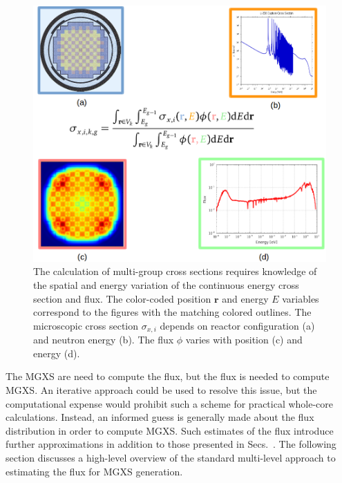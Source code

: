 \begin{figure}[h!]
  \centering
  \includegraphics[width=0.9\linewidth]{figures/mgxs/mgxs-overlay}
\caption[Energy and spatial variation in \ac{MGXS}]{The calculation of multi-group cross sections requires knowledge of the spatial and energy variation of the continuous energy cross section and flux. The color-coded position $\mathbf{r}$ and energy $E$ variables correspond to the figures with the matching colored outlines. The microscopic cross section $\sigma_{x,i}$ depends on reactor configuration (a) and neutron energy (b). The flux $\phi$ varies with position (c) and energy (d).}
\label{fig:chap2-mgxs-overlay}
\end{figure}

The \ac{MGXS} are need to compute the flux, but the flux is needed to compute \ac{MGXS}. An iterative approach could be used to resolve this issue, but the computational expense would prohibit such a scheme for practical whole-core calculations. Instead, an informed guess is generally made about the flux distribution in order to compute \ac{MGXS}. Such estimates of the flux introduce further approximations in addition to those presented in Secs.~. The following section discusses a high-level overview of the standard multi-level approach to estimating the flux for \ac{MGXS} generation.


